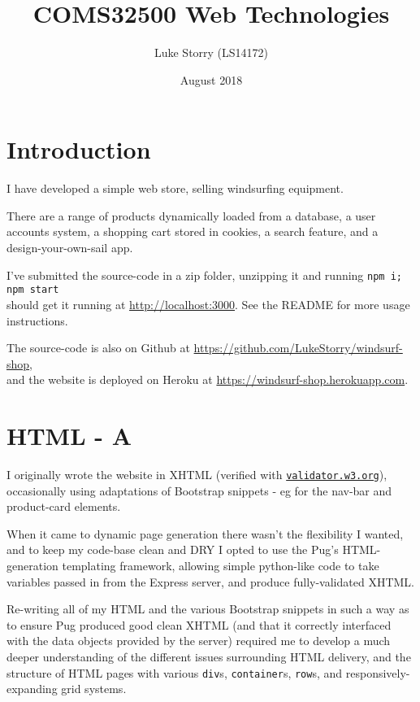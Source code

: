 \documentclass[12pt]{article}
\title{COMS32500 Web Technologies}
\author{Luke Storry (LS14172)}
\date{August 2018}
\begin{document}
\maketitle


\section*{Introduction}
I have developed a simple web store, selling windsurfing equipment. 

There are a range of products dynamically loaded from a database, a user accounts system, a shopping cart stored in cookies, a search feature, and a design-your-own-sail app.

I've submitted the source-code in a zip folder, unzipping it and running \verb|npm i; npm start| \\
should get it running at \url{http://localhost:3000}. 
See the README for more usage instructions. 

The source-code is also on Github at \url{https://github.com/LukeStorry/windsurf-shop},\\
and the website is deployed on Heroku at \url{https://windsurf-shop.herokuapp.com}.

\section*{HTML \large\normalfont - A}
I originally wrote the website in XHTML (verified with \href{https://validator.w3.org}{\texttt{validator.w3.org}}), occasionally using adaptations of Bootstrap snippets - eg for the nav-bar and product-card elements.

When it came to dynamic page generation there wasn't the flexibility I wanted, and to keep my code-base clean and DRY I opted to use the Pug's HTML-generation templating framework, allowing simple python-like code to take variables passed in from the Express server, and produce fully-validated XHTML.

Re-writing all of my HTML and the various Bootstrap snippets in such a way as to ensure Pug produced good clean XHTML (and that it correctly interfaced with the data objects provided by the server) required me to develop a much deeper understanding of the different issues surrounding HTML delivery, and the structure of HTML pages with various \verb|div|s, \verb|container|s, \verb|row|s, and responsively-expanding grid systems.
\end{document}
